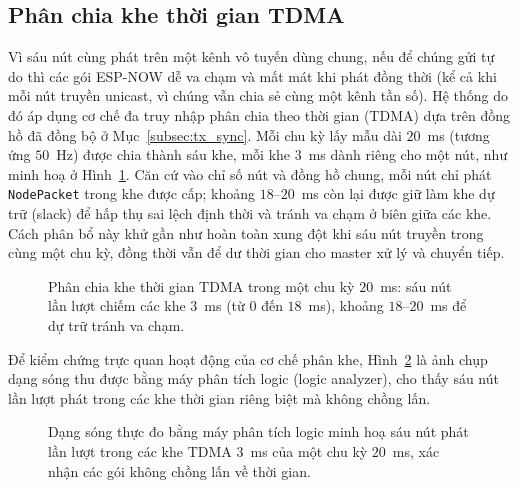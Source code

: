 \documentclass[../DoAn.tex]{subfiles}
\begin{document}
\subsection{Phân chia khe thời gian TDMA}
\label{subsec:tx_tdma}
Vì sáu nút cùng phát trên một kênh vô tuyến dùng chung, nếu để chúng gửi tự do thì các gói ESP-NOW dễ va chạm và mất mát khi phát đồng thời (kể cả khi mỗi nút truyền unicast, vì chúng vẫn chia sẻ cùng một kênh tần số). Hệ thống do đó áp dụng cơ chế đa
truy nhập phân chia theo thời gian (TDMA) dựa trên đồng hồ đã đồng bộ ở
Mục~\ref{subsec:tx_sync}. Mỗi chu kỳ lấy mẫu dài $20$~ms (tương ứng $50$~Hz) được
chia thành sáu khe, mỗi khe $3$~ms dành riêng cho một nút, như minh hoạ ở
Hình~\ref{fig:tdma}. Căn cứ vào chỉ số nút và đồng hồ chung, mỗi nút chỉ phát
\texttt{NodePacket} trong khe được cấp; khoảng $18$--$20$~ms còn lại được giữ làm
khe dự trữ (slack) để hấp thụ sai lệch định thời và tránh va chạm ở biên giữa các
khe. Cách phân bổ này khử gần như hoàn toàn xung đột khi sáu nút truyền trong cùng
một chu kỳ, đồng thời vẫn để dư thời gian cho master xử lý và chuyển tiếp.

\begin{figure}[h]
    \centering
    \caption{Phân chia khe thời gian TDMA trong một chu kỳ $20$~ms: sáu nút lần lượt chiếm các khe $3$~ms (từ $0$ đến $18$~ms), khoảng $18$--$20$~ms để dự trữ tránh va chạm.}
    \label{fig:tdma}
\end{figure}

Để kiểm chứng trực quan hoạt động của cơ chế phân khe, Hình~\ref{fig:tdma_capture} là ảnh chụp dạng sóng thu được bằng máy phân tích logic (logic analyzer), cho thấy sáu nút lần lượt phát trong các khe thời gian riêng biệt mà không chồng lấn.

\begin{figure}[h]
    \centering
    \caption{Dạng sóng thực đo bằng máy phân tích logic minh hoạ sáu nút phát lần lượt trong các khe TDMA $3$~ms của một chu kỳ $20$~ms, xác nhận các gói không chồng lấn về thời gian.}
    \label{fig:tdma_capture}
\end{figure}
\end{document}
